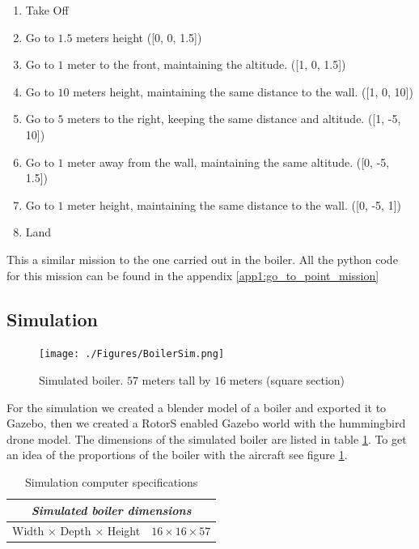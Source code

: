     \begin{enumerate}
      \item Take Off
      \item Go to $1.5$ meters height ([0, 0, 1.5])
      \item Go to $1$ meter to the front, maintaining the altitude. ([1, 0, 1.5])
      \item Go to $10$ meters height, maintaining the same distance to the wall. ([1, 0, 10])
      \item Go to $5$ meters to the right, keeping the same distance and altitude. ([1, -5, 10])
      \item Go to $1$ meter away from the wall, maintaining the same altitude. ([0, -5, 1.5])
      \item Go to $1$ meter height, maintaining the same distance to the wall. ([0, -5, 1])
      \item Land
    \end{enumerate}

    This a similar mission to the one carried out in the boiler. All the python code for this mission can be found in the appendix \ref{app1:go_to_point_mission}

  \pagebreak

  \subsection{Simulation} \label{ch_5:subsect:exp_simulation}

    \begin{figure}[!h]
      \centering
      \texttt{[image: ./Figures/BoilerSim.png]}
      \caption{Simulated boiler. $57$ meters tall by $16$ meters (square section)}
      \label{ch_5:fig:boiler_sim}
    \end{figure}

    For the simulation we created a blender model of a boiler and exported it to Gazebo, then we created a RotorS enabled Gazebo world with the hummingbird drone model. The dimensions of the simulated boiler are listed in table \ref{ch_5:table:boiler_sim_dims}. To get an idea of the proportions of the boiler with the aircraft see figure \ref{ch_5:fig:boiler_sim}.  

    \begin{table}[!h]
      \centering
      \begin{tabular}{lr} \toprule
        \multicolumn{2}{c}{\textit{Simulated boiler dimensions}}        \\ \midrule
        Width $\times$ Depth $\times$ Height & $16 \times 16 \times 57$ \\ \bottomrule
        \hline
      \end{tabular}
      \caption{Simulation computer specifications}
      \label{ch_5:table:boiler_sim_dims}
    \end{table}

